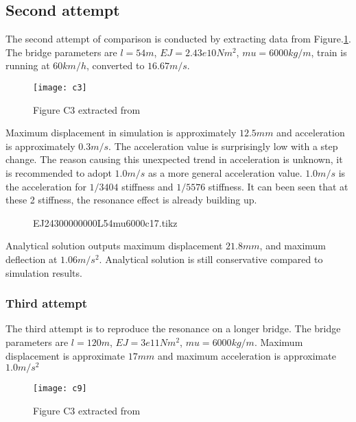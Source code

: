 \subsection{Second attempt}

The second attempt of comparison is conducted by extracting data from Figure.\ref{fig:c3}.  The bridge parameters are $l=54m$, $EJ=2.43e10Nm^2$, $mu=6000kg/m$, train is running at $60km/h$, converted to $16.67m/s$. 

\begin{figure}[h!]
    \centering
    \texttt{[image: c3]}
    \caption{Figure C3 extracted from \cite{d181dt329} }
    \label{fig:c3}
\end{figure}

Maximum displacement in simulation is approximately $12.5mm$ and acceleration is approximately 0$.3m/s$. The acceleration value is surprisingly low with a step change. The reason causing this unexpected trend in acceleration is unknown, it is recommended to adopt $1.0m/s$ as a more general acceleration value. $1.0m/s$ is the acceleration for $1/3404$ stiffness and $1/5576$ stiffness. It can been seen that at these 2 stiffness, the resonance effect is already building up.

\begin{figure}[h!]
\centering 
\setlength\figureheight{6cm} 
\setlength\figurewidth{6cm} 
 
\caption{EJ24300000000L54mu6000c17.tikz} 
\label{fig:EJ24300000000L54mu6000c17} 
\end{figure}

Analytical solution outputs maximum displacement $21.8mm$, and maximum deflection at $1.06m/s^2$. Analytical solution is still conservative compared to simulation results. 

\subsubsection{Third attempt}

The third attempt is to reproduce the resonance on a longer bridge. The bridge parameters are $l=120m$, $EJ=3e11Nm^2$, $mu=6000kg/m$. Maximum displacement is approximate $17mm$ and maximum acceleration is approximate $1.0m/s^2$

\begin{figure}[h!]
    \centering
    \texttt{[image: c9]}
    \caption{Figure C3 extracted from \cite{d181dt329} }
    \label{fig:c9}
\end{figure}

